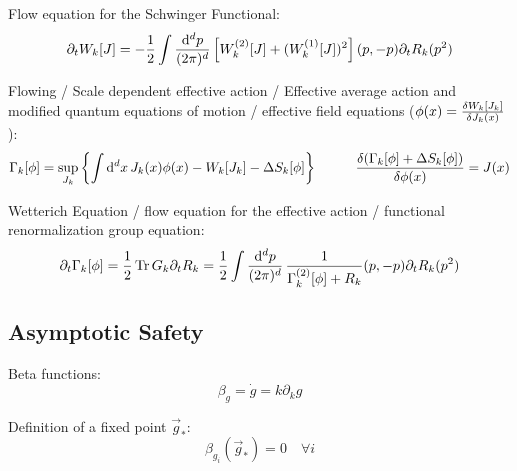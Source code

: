 		\noindent
		Flow equation for the Schwinger Functional:
		\begin{equation}
			\partial_t W_k[J] = -\frac{1}{2}\int \frac{\dd^d p}{(2\pi)^d} \, \qty[W^{(2)}_k[J]+(W_k^{(1)}[J])^2](p,-p) \partial_t R_k(p^2)
		\end{equation}

		\noindent
		Flowing / Scale dependent effective action / Effective average action and modified quantum equations of motion / effective field equations ($\phi(x)= \fdv{W_k[J_k]}{J_k(x)}$):
		\begin{equation}
			\Gamma_k[\phi] = \sup_{J_k} \qty{\int \dd^d x\, J_k(x) \phi(x) - W_k[J_k] - \Delta S_k[\phi]}
			\hsp \fdv{(\Gamma_k[\phi] + \Delta S_k[\phi])}{\phi(x)} = J(x)
		\end{equation}

		\noindent
		Wetterich Equation / flow equation for the effective action / functional renormalization group equation:
		\begin{equation}
			\partial_t \Gamma_k[\phi] = \frac{1}{2} \Tr G_k \partial_t R_k
			=\frac{1}{2} \int \frac{\dd^d p}{(2\pi)^d} \, \frac{1}{\Gamma^{(2)}_k[\phi] + R_k}(p,-p) \partial_t R_k(p^2)
		\end{equation}

	\subsection{Asymptotic Safety}
		Beta functions:
		\begin{equation}
			\beta_g = \dot{g} = k \partial_k g
		\end{equation}

		\noindent
		Definition of a fixed point $\vec{g}_{*}$:
		\begin{equation}
			\beta_{g_i}(\vec{g}_{*}) = 0 \quad \forall i
		\end{equation}

